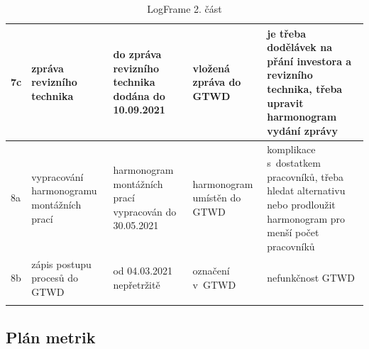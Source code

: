 \documentclass[a4paper, twoside, 11pt]{article}
\begin{document}
\begin{table}[H]
{\begin{tabular}{ !{\vrule width 2pt} p{5cm} | p{5cm} | p{5cm} | p{5cm} | p{5cm} !{\vrule width 2pt} }
	7c & zpráva revizního technika & do zpráva revizního technika dodána do 10.09.2021 & vložená zpráva do GTWD & je třeba dodělávek na přání investora a revizního technika, třeba upravit harmonogram vydání zprávy  \\ \hline
	8a & vypracování harmonogramu montážních prací & harmonogram montážních prací vypracován do 30.05.2021
 & harmonogram umístěn do GTWD & komplikace s~dostatkem pracovníků, třeba hledat alternativu nebo prodloužit harmonogram pro menší počet pracovníků   \\ \hline
	8b & zápis postupu procesů do GTWD & od 04.03.2021 nepřetržitě & označení v~GTWD & nefunkčnost GTWD  \\
			\end{tabular}
		}
		\caption{LogFrame 2. část}
		\end{table}


	\subsection{Plán metrik}\label{sec:plan_metrik}
	
\end{document}
